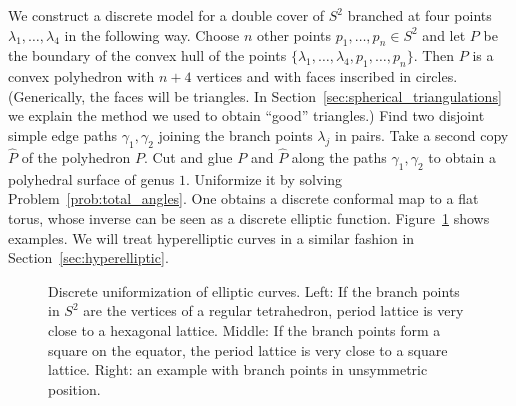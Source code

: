 \documentclass[Thesis]{subfiles}
\begin{document}

We construct a discrete model for a double cover of $S^{2}$ branched
at four points $\lambda_1,\ldots,\lambda_{4}$ in the following way.
Choose $n$ other points $p_1,\ldots,p_n\in S^2$ and let $P$ be the
boundary of the convex hull of the points
$\{\lambda_1,\ldots,\lambda_{4},p_1,\ldots,p_n\}$. Then $P$ is a
convex polyhedron with $n+4$ vertices and with faces inscribed in
circles. (Generically, the faces will be triangles. In
Section~\ref{sec:spherical_triangulations} we explain the method we
used to obtain ``good'' triangles.) Find two disjoint simple edge
paths $\gamma_1,\gamma_{2}$ joining the branch points $\lambda_{j}$ in
pairs. Take a second copy $\hat P$ of the polyhedron $P$. Cut and glue
$P$ and $\hat P$ along the paths $\gamma_1,\gamma_{2}$ to obtain a
polyhedral surface of genus $1$. Uniformize it by solving
Problem~\ref{prob:total_angles}. One obtains a discrete conformal map
to a flat torus, whose inverse can be seen as a discrete elliptic
function. Figure~\ref{fig:p_functions} shows examples. We will treat
hyperelliptic curves in a similar fashion in
Section~\ref{sec:hyperelliptic}.

\begin{figure}
\centering
{}
\caption{Discrete uniformization of elliptic curves. Left: If the
  branch points in $S^{2}$ are the vertices of a regular tetrahedron,
  period lattice is very close to a hexagonal lattice. Middle: If the
  branch points form a square on the equator, the period lattice is
  very close to a square lattice. Right: an example with branch points
  in unsymmetric position.}
\label{fig:p_functions}
\end{figure}
\end{document}
